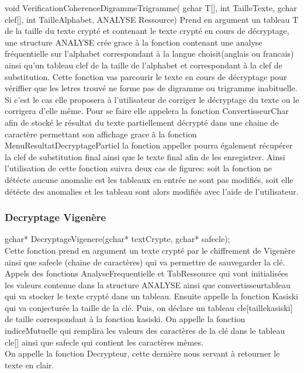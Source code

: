 \documentclass[a4]{article}
\begin{document}
void VerificationCoherenceDigrammeTrigramme( gchar T[], int TailleTexte, gchar clef[], int TailleAlphabet, 
ANALYSE Ressource)
	Prend en argument un tableau T de la taille du texte crypté et contenant le texte crypté en cours de
	 décryptage, une structure ANALYSE crée grace à la fonction contenant une analyse fréquentielle sur 
	 l'alphabet correspondant à la langue choisit(anglais ou francais) ainsi qu'un tableau clef de la
	  taille de l'alphabet et correspondant à la clef de substitution.
	Cette fonction vas parcourir le texte en cours de décryptage pour vériffier que les letres trouvé ne
	 forme pas de digramme ou trigramme inabituelle. Si c'est le cas elle proposera à l'utilisateur de 
	 corriger le décryptage du texte ou le corrigera d'elle même. Pour se faire elle appelera la fonction
	  ConvertisseurChar afin de stocké le résultat du texte partiellement décrypté dans une chaine de 
	  caractère permettant son affichage grace à la fonction 
   MenuResultatDecryptagePartiel la fonction appeller pourra également récupérer la clef
 de substitution final ainsi que le texte final afin de les enregistrer. Ainsi l'utilisation de cette
  fonction suivra deux cas
de figures: soit la fonction ne détécte aucune anomalie est les tableaux en entrée ne sont pas modifiés,
 soit elle détécte des anomalies et les tableau sont alors modifiés avec l'aide de l'utilisateur.
	
	
	\subsubsection{Decryptage Vigenère}
	gchar* DecryptageVigenere(gchar* textCrypte, gchar* safecle);\\
		Cette fonction prend en argument un texte crypté par le chiffrement de Vigenère ainsi 
		que safecle (chaine de caractères) qui va permettre de sauvegarder la clé.
		Appels des fonctions AnalyseFrequentielle et TabRessource qui vont initialisées les valeurs 
		contenue dans la structure ANALYSE ainsi que convertisseurtableau qui va stocker le texte crypté 
		dans un tableau.
		Ensuite appelle la fonction Kasiski qui va conjecturée la taille de la clé.
		Puis, on déclare un tableau cle[taillekasiski] de taille correspondant à la fonction kasiski. 
		On appelle la fonction indiceMutuelle qui remplira les valeurs des caractères de la clé dans le tableau cle[]
		ainsi que safecle qui contient les caractères mêmes.\\
		On appelle la fonction Decrypteur, cette dernière nous servant à retourner le texte en clair.\\
	
\end{document}
